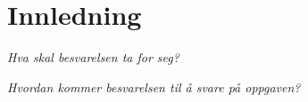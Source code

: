 \section{Innledning}

\textit{Hva skal besvarelsen ta for seg?}

\textit{Hvordan kommer besvarelsen til å svare på oppgaven?}